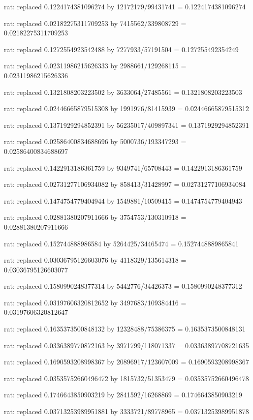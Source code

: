 \documentclass[a4paper,10pt]{article}
\begin{document}
\begin{eulernotebook}
\begin{eulercomment}
\begin{eulercomment}
\begin{eulercomment}
\begin{eulercomment}
\begin{eulercomment}
\begin{eulercomment}
\begin{eulercomment}
\begin{eulercomment}
\begin{eulercomment}
\begin{eulercomment}
\begin{eulercomment}
\begin{eulercomment}
\begin{eulercomment}
\begin{eulercomment}
\begin{eulercomment}
\begin{eulercomment}
\begin{euleroutput}
  rat: replaced 0.1224174381096274 by 12172179/99431741 = 0.1224174381096274
  
  rat: replaced 0.02182275311709253 by 7415562/339808729 = 0.02182275311709253
  
  rat: replaced 0.1272554923542488 by 7277933/57191504 = 0.127255492354249
  
  rat: replaced 0.02311986215626333 by 2988661/129268115 = 0.02311986215626336
  
  rat: replaced 0.1321808203223502 by 3633064/27485561 = 0.1321808203223503
  
  rat: replaced 0.02446665879515308 by 1991976/81415939 = 0.02446665879515312
  
  rat: replaced 0.1371929294852391 by 56235017/409897341 = 0.1371929294852391
  
  rat: replaced 0.02586400834688696 by 5000736/193347293 = 0.02586400834688697
  
  rat: replaced 0.1422913186361759 by 9349741/65708443 = 0.1422913186361759
  
  rat: replaced 0.02731277106934082 by 858413/31428997 = 0.02731277106934084
  
  rat: replaced 0.1474754779404944 by 1549881/10509415 = 0.1474754779404943
  
  rat: replaced 0.02881380207911666 by 3754753/130310918 = 0.02881380207911666
  
  rat: replaced 0.152744888986584 by 5264425/34465474 = 0.1527448889865841
  
  rat: replaced 0.03036795126603076 by 4118329/135614318 = 0.03036795126603077
  
  rat: replaced 0.1580990248377314 by 5442776/34426373 = 0.1580990248377312
  
  rat: replaced 0.03197606320812652 by 3497683/109384416 = 0.03197606320812647
  
  rat: replaced 0.1635373500848132 by 12328488/75386375 = 0.1635373500848131
  
  rat: replaced 0.0336389770872163 by 3971799/118071337 = 0.03363897708721635
  
  rat: replaced 0.1690593208998367 by 20896917/123607009 = 0.1690593208998367
  
  rat: replaced 0.03535752660496472 by 1815732/51353479 = 0.03535752660496478
  
  rat: replaced 0.1746643850903219 by 2841592/16268869 = 0.1746643850903219
  
  rat: replaced 0.03713253989951881 by 3333721/89778965 = 0.03713253989951878
  

\end{euleroutput}
\end{eulercomment}
\end{eulercomment}
\end{eulercomment}
\end{eulercomment}
\end{eulercomment}
\end{eulercomment}
\end{eulercomment}
\end{eulercomment}
\end{eulercomment}
\end{eulercomment}
\end{eulercomment}
\end{eulercomment}
\end{eulercomment}
\end{eulercomment}
\end{eulercomment}
\end{eulercomment}
\end{eulernotebook}
\end{document}
